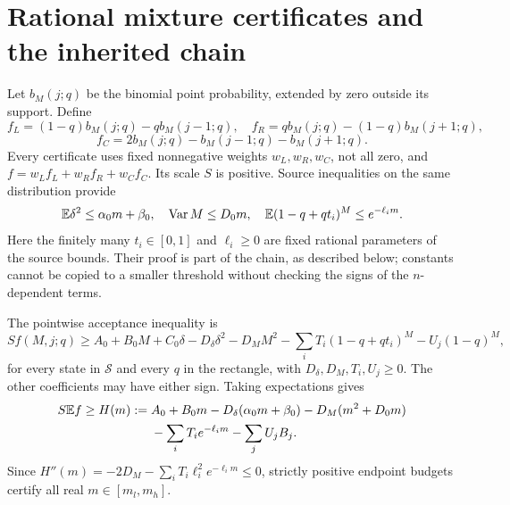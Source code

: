 \section{Rational mixture certificates and the inherited chain}\label{sec:cert59}
Let $b_M(j;q)$ be the binomial point probability, extended by zero outside its support. Define
\[
 f_L=(1-q)b_M(j;q)-qb_M(j-1;q),\quad
 f_R=qb_M(j;q)-(1-q)b_M(j+1;q),
\]
\[
 f_C=2b_M(j;q)-b_M(j-1;q)-b_M(j+1;q).
\]
Every certificate uses fixed nonnegative weights $w_L,w_R,w_C$, not all zero, and $f=w_Lf_L+w_Rf_R+w_Cf_C$. Its scale $S$ is positive. Source inequalities on the same distribution provide
\begin{equation}\label{l59:sourcebounds}
 \mathbb E\delta^2\le\alpha_0m+\beta_0,\quad
 \operatorname{Var} M\le D_0m,\quad
 \mathbb E(1-q+qt_i)^M\le e^{-\ell_i m}.
\end{equation}
Here the finitely many $t_i\in[0,1]$ and $\ell_i\ge0$ are fixed rational parameters of the source bounds. Their proof is part of the chain, as described below; constants cannot be copied to a smaller threshold without checking the signs of the $n$-dependent terms.

The pointwise acceptance inequality is
\begin{equation}\label{l59:pointwise}
 Sf(M,j;q)\ge A_0+B_0M+C_0\delta-D_\delta\delta^2-D_MM^2
 -\sum_iT_i(1-q+qt_i)^M-U_j(1-q)^M,
\end{equation}
for every state in $\mathcal S$ and every $q$ in the rectangle, with $D_\delta,D_M,T_i,U_j\ge0$. The other coefficients may have either sign. Taking expectations gives
\begin{align}\label{l59:budget}
 S\mathbb E f\ge H(m):={}&A_0+B_0m-D_\delta(\alpha_0m+\beta_0)
 -D_M(m^2+D_0m)\notag\\
 &-\sum_iT_i e^{-\ell_i m}-\sum_jU_jB_j.
\end{align}
Since $H''(m)=-2D_M-\sum_iT_i\ell_i^2e^{-\ell_i m}\le0$, strictly positive endpoint budgets certify all real $m\in[m_l,m_h]$.

